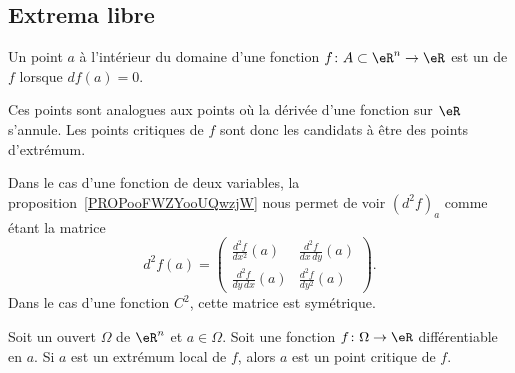 \newcommand{\CaptionFigVBOIooRHhKOH}{La dérivée de \( x^3\) s'annule en \( x=0\), mais ce n'est ni un minimum ni un maximum.}


\subsection{Extrema libre}

\begin{definition}      \label{DEFooYJLZooLkEAYf}
	Un point \( a\) à l'intérieur du domaine d'une fonction \( f\colon A\subset\eR^n\to \eR\) est un  de \( f\) lorsque \( df(a)=0\).
\end{definition}

Ces points sont analogues aux points où la dérivée d'une fonction sur \( \eR\) s'annule. Les points critiques de \( f\) sont donc les candidats à être des points d'extrémum.

Dans le cas d'une fonction de deux variables, la proposition~\ref{PROPooFWZYooUQwzjW} nous permet de voir \( (d^2f)_a\) comme étant la matrice
\begin{equation}
	d^2f(a)=\begin{pmatrix}
		\frac{ d^2f  }{ dx^2 }(a)   & \frac{ d^2f  }{ dx\,dy }(a) \\
		\frac{ d^2f  }{ dy\,dx }(a) & \frac{ d^2f  }{ dy^2 }(a)
	\end{pmatrix}.
\end{equation}
Dans le cas d'une fonction \( C^2\), cette matrice est symétrique.

\begin{proposition} \label{PropUQRooPgJsuz}
	Soit un ouvert \( \Omega\) de \( \eR^n\) et \( a\in \Omega\). Soit une fonction \( f\colon \Omega\to \eR\) différentiable en \( a\). Si \( a\) est un extrémum local de \( f\), alors \( a\) est un point critique de \( f\).
\end{proposition}

